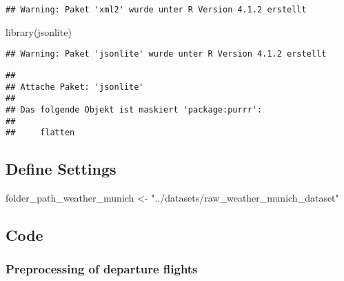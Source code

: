 \documentclass[
]{article}
\newenvironment{Shaded}{\begin{snugshade}}{\end{snugshade}}
\newcommand{\AttributeTok}[1]{\textcolor[rgb]{0.77,0.63,0.00}{#1}}
\newcommand{\CommentTok}[1]{\textcolor[rgb]{0.56,0.35,0.01}{\textit{#1}}}
\newcommand{\ConstantTok}[1]{\textcolor[rgb]{0.00,0.00,0.00}{#1}}
\newcommand{\FunctionTok}[1]{\textcolor[rgb]{0.00,0.00,0.00}{#1}}
\newcommand{\NormalTok}[1]{#1}
\newcommand{\OtherTok}[1]{\textcolor[rgb]{0.56,0.35,0.01}{#1}}
\newcommand{\SpecialCharTok}[1]{\textcolor[rgb]{0.00,0.00,0.00}{#1}}
\newcommand{\StringTok}[1]{\textcolor[rgb]{0.31,0.60,0.02}{#1}}
\begin{document}
\begin{verbatim}
## Warning: Paket 'xml2' wurde unter R Version 4.1.2 erstellt
\end{verbatim}

\begin{Shaded}
\begin{Highlighting}[]
\FunctionTok{library}\NormalTok{(jsonlite)}
\end{Highlighting}
\end{Shaded}

\begin{verbatim}
## Warning: Paket 'jsonlite' wurde unter R Version 4.1.2 erstellt
\end{verbatim}

\begin{verbatim}
## 
## Attache Paket: 'jsonlite'
## 
## Das folgende Objekt ist maskiert 'package:purrr':
## 
##     flatten
\end{verbatim}

\hypertarget{define-settings}{%
\subsection{Define Settings}\label{define-settings}}

\begin{Shaded}
\begin{Highlighting}[]
\NormalTok{folder\_path\_weather\_munich }\OtherTok{\textless{}{-}} \StringTok{"../datasets/raw\_weather\_munich\_dataset"}
\end{Highlighting}
\end{Shaded}

\hypertarget{code}{%
\subsection{Code}\label{code}}

\hypertarget{preprocessing-of-departure-flights}{%
\subsubsection{Preprocessing of departure
flights}\label{preprocessing-of-departure-flights}}

\begin{Shaded}
\end{Shaded}
\end{document}
